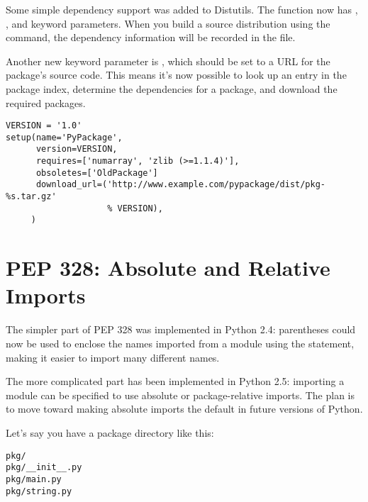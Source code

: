 \documentclass{howto}
\begin{document}
Some simple dependency support was added to Distutils.  The
 function now has , ,
and  keyword parameters.  When you build a source
distribution using the  command, the dependency
information will be recorded in the  file.

Another new keyword parameter is , which should be
set to a URL for the package's source code.  This means it's now
possible to look up an entry in the package index, determine the
dependencies for a package, and download the required packages.

\begin{verbatim}
VERSION = '1.0'
setup(name='PyPackage', 
      version=VERSION,
      requires=['numarray', 'zlib (>=1.1.4)'],
      obsoletes=['OldPackage']
      download_url=('http://www.example.com/pypackage/dist/pkg-%s.tar.gz'
                    % VERSION),
     )
\end{verbatim}
 
\begin{seealso}


\end{seealso}


\section{PEP 328: Absolute and Relative Imports\label{pep-328}}

The simpler part of PEP 328 was implemented in Python 2.4: parentheses
could now be used to enclose the names imported from a module using
the  statement, making it easier to import
many different names.

The more complicated part has been implemented in Python 2.5:
importing a module can be specified to use absolute or
package-relative imports.  The plan is to move toward making absolute
imports the default in future versions of Python.

Let's say you have a package directory like this:
\begin{verbatim}
pkg/
pkg/__init__.py
pkg/main.py
pkg/string.py
\end{verbatim}
\end{document}
